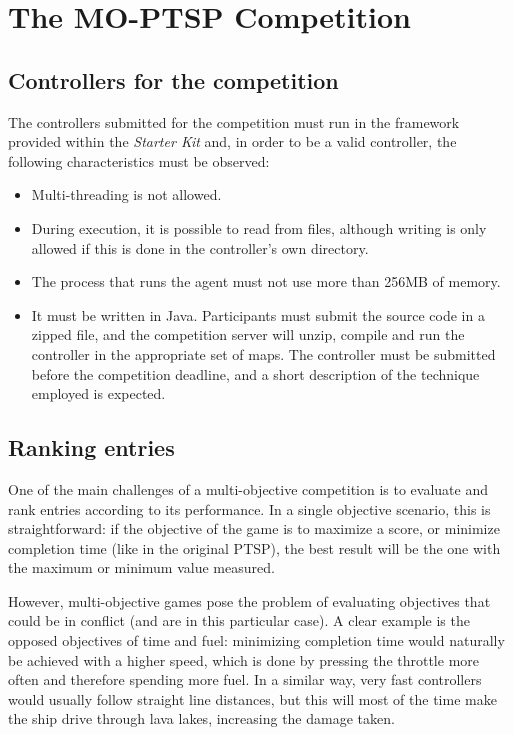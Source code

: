 \documentclass[conference]{IEEEtran}
\begin{document}
\section{The MO-PTSP Competition}

\subsection{Controllers for the competition}

The controllers submitted for the competition must run in the framework provided within the \textit{Starter Kit} and, in order to be a valid controller, the following characteristics must be observed:

\begin{itemize}
\item Multi-threading is not allowed.
\item During execution, it is possible to read from files, although writing is only allowed if this is done in the controller's own directory.
\item The process that runs the agent must not use more than 256MB of memory.
\item It must be written in Java. Participants must submit the source code in a zipped file, and the competition server will unzip, compile and run the controller in the appropriate set of maps. The controller must be submitted before the competition deadline, and a short description of the technique employed is expected.
\end{itemize}


\subsection{Ranking entries}

One of the main challenges of a multi-objective competition is to evaluate and rank entries according to its performance. In a single objective scenario, this is straightforward: if the objective of the game is to maximize a score, or minimize completion time (like in the original PTSP), the best result will be the one with the maximum or minimum value measured.

However, multi-objective games pose the problem of evaluating objectives that could be in conflict (and are in this particular case). A clear example is the opposed objectives of time and fuel: minimizing completion time would naturally be achieved with a higher speed, which is done by pressing the throttle more often and therefore spending more fuel. In a similar way, very fast controllers  would usually follow straight line distances, but this will most of the time make the ship drive through lava lakes, increasing the damage taken.
\end{document}
